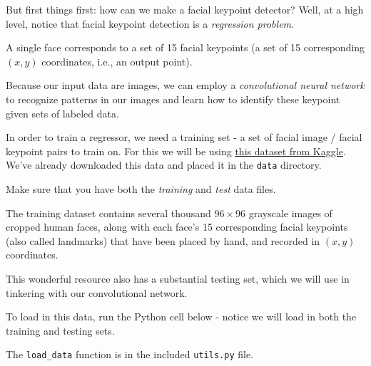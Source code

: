 \documentclass[11pt]{article}
\begin{document}
But first things first: how can we make a facial keypoint detector?
Well, at a high level, notice that facial keypoint detection is a
\emph{regression problem}.

A single face corresponds to a set of 15 facial keypoints (a set of 15
corresponding \((x, y)\) coordinates, i.e., an output point).

Because our input data are images, we can employ a \emph{convolutional
neural network} to recognize patterns in our images and learn how to
identify these keypoint given sets of labeled data.

In order to train a regressor, we need a training set - a set of facial
image / facial keypoint pairs to train on. For this we will be using
\href{https://www.kaggle.com/c/facial-keypoints-detection/data}{this
dataset from Kaggle}. We've already downloaded this data and placed it
in the \texttt{data} directory.

Make sure that you have both the \emph{training} and \emph{test} data
files.

The training dataset contains several thousand \(96 \times 96\)
grayscale images of cropped human faces, along with each face's 15
corresponding facial keypoints (also called landmarks) that have been
placed by hand, and recorded in \((x, y)\) coordinates.

This wonderful resource also has a substantial testing set, which we
will use in tinkering with our convolutional network.

To load in this data, run the Python cell below - notice we will load in
both the training and testing sets.

The \texttt{load\_data} function is in the included \texttt{utils.py}
file.
\end{document}
